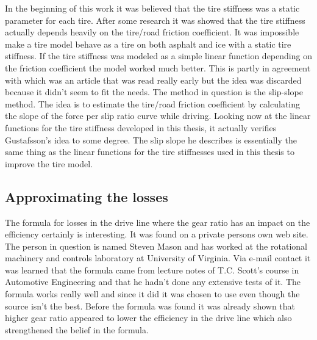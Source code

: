 In the beginning of this work it was believed that the tire stiffness was a static parameter for each tire. After some research it was showed that the tire stiffness actually depends heavily on the tire/road friction coefficient. It was impossible make a tire model behave as a tire on both asphalt and ice with a static tire stiffness. If the tire stiffness was modeled as a simple linear function depending on the friction coefficient the model worked much better. This is partly in agreement with \cite{gustafsson1997} which was an article that was read really early but the idea was discarded because it didn't seem to fit the needs. The method in question is the slip-slope method. The idea is to estimate the tire/road friction coefficient by calculating the slope of the force per slip ratio curve while driving. Looking now at the linear functions for the tire stiffness developed in this thesis, it actually verifies Gustafsson's idea to some degree. The slip slope he describes is essentially the same thing as the linear functions for the tire stiffnesses used in this thesis to improve the tire model.


\subsection{Approximating the losses}
The formula for losses in the drive line where the gear ratio has an impact on the efficiency certainly is interesting. It was found on a private persons own web site. The person in question is named Steven Mason and has worked at the rotational machinery and controls laboratory at University of Virginia. Via e-mail contact it was learned that the formula came from lecture notes of T.C. Scott's course in Automotive Engineering and that he hadn't done any extensive tests of it. The formula works really well and since it did it was chosen to use even though the source isn't the best. Before the formula was found it was already shown that higher gear ratio appeared to lower the efficiency in the drive line which also strengthened the belief in the formula. 


